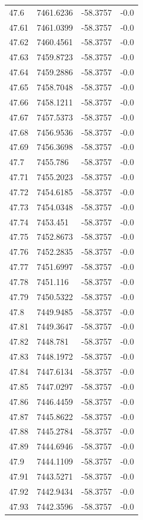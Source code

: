 \begin{table}[H]
\begin{tabular}{llll}
47.6 & 7461.6236 & -58.3757 & -0.0 \\
47.61 & 7461.0399 & -58.3757 & -0.0 \\
47.62 & 7460.4561 & -58.3757 & -0.0 \\
47.63 & 7459.8723 & -58.3757 & -0.0 \\
47.64 & 7459.2886 & -58.3757 & -0.0 \\
47.65 & 7458.7048 & -58.3757 & -0.0 \\
47.66 & 7458.1211 & -58.3757 & -0.0 \\
47.67 & 7457.5373 & -58.3757 & -0.0 \\
47.68 & 7456.9536 & -58.3757 & -0.0 \\
47.69 & 7456.3698 & -58.3757 & -0.0 \\
47.7 & 7455.786 & -58.3757 & -0.0 \\
47.71 & 7455.2023 & -58.3757 & -0.0 \\
47.72 & 7454.6185 & -58.3757 & -0.0 \\
47.73 & 7454.0348 & -58.3757 & -0.0 \\
47.74 & 7453.451 & -58.3757 & -0.0 \\
47.75 & 7452.8673 & -58.3757 & -0.0 \\
47.76 & 7452.2835 & -58.3757 & -0.0 \\
47.77 & 7451.6997 & -58.3757 & -0.0 \\
47.78 & 7451.116 & -58.3757 & -0.0 \\
47.79 & 7450.5322 & -58.3757 & -0.0 \\
47.8 & 7449.9485 & -58.3757 & -0.0 \\
47.81 & 7449.3647 & -58.3757 & -0.0 \\
47.82 & 7448.781 & -58.3757 & -0.0 \\
47.83 & 7448.1972 & -58.3757 & -0.0 \\
47.84 & 7447.6134 & -58.3757 & -0.0 \\
47.85 & 7447.0297 & -58.3757 & -0.0 \\
47.86 & 7446.4459 & -58.3757 & -0.0 \\
47.87 & 7445.8622 & -58.3757 & -0.0 \\
47.88 & 7445.2784 & -58.3757 & -0.0 \\
47.89 & 7444.6946 & -58.3757 & -0.0 \\
47.9 & 7444.1109 & -58.3757 & -0.0 \\
47.91 & 7443.5271 & -58.3757 & -0.0 \\
47.92 & 7442.9434 & -58.3757 & -0.0 \\
47.93 & 7442.3596 & -58.3757 & -0.0 \\

\end{tabular}
\end{table}
